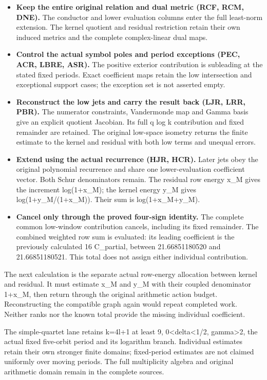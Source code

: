 \documentclass[
]{article}
\providecommand{\tightlist}{%
  \setlength{\itemsep}{0pt}\setlength{\parskip}{0pt}}
\begin{document}
\begin{itemize}
\tightlist
\item
  \textbf{Keep the entire original relation and dual metric (RCF, RCM,
  DNE).} The conductor and lower evaluation columns enter the full
  least-norm extension. The kernel quotient and residual restriction
  retain their own induced metrics and the complete complex-linear dual
  maps.
\item
  \textbf{Control the actual symbol poles and period exceptions (PEC,
  ACR, LBRE, ASR).} The positive exterior contribution is subleading at
  the stated fixed periods. Exact coefficient maps retain the low
  intersection and exceptional support cases; the exception set is not
  asserted empty.
\item
  \textbf{Reconstruct the low jets and carry the result back (LJR, LRR,
  PBR).} The numerator constraints, Vandermonde map and Gamma basis give
  an explicit quotient Jacobian. Its full q log k contribution and fixed
  remainder are retained. The original low-space isometry returns the
  finite estimate to the kernel and residual with both low terms and
  unequal errors.
\item
  \textbf{Extend using the actual recurrence (HJR, HCR).} Later jets
  obey the original polynomial recurrence and share one lower-evaluation
  coefficient vector. Both Schur denominators remain. The residual row
  energy x\_M gives the increment log(1+x\_M); the kernel energy y\_M
  gives log(1+y\_M/(1+x\_M)). Their sum is log(1+x\_M+y\_M).
\item
  \textbf{Cancel only through the proved four-sign identity.} The
  complete common low-window contribution cancels, including its fixed
  remainder. The combined weighted row sum is evaluated: its leading
  coefficient is the previously calculated 16 C\_partial, between
  21.66851180520 and 21.66851180521. This total does not assign either
  individual contribution.
\end{itemize}

The next calculation is the separate actual row-energy allocation
between kernel and residual. It must estimate x\_M and y\_M with their
coupled denominator 1+x\_M, then return through the original arithmetic
action budget. Reconstructing the compatible graph again would repeat
completed work. Neither ranks nor the known total provide the missing
individual coefficient.

The simple-quartet lane retains k=4l+1 at least 9,
0\textless delta\textless1/2, gamma\textgreater2, the actual fixed
five-orbit period and its logarithm branch. Individual estimates retain
their own stronger finite domains; fixed-period estimates are not
claimed uniformly over moving periods. The full multiplicity algebra and
original arithmetic domain remain in the complete sources.
\end{document}
